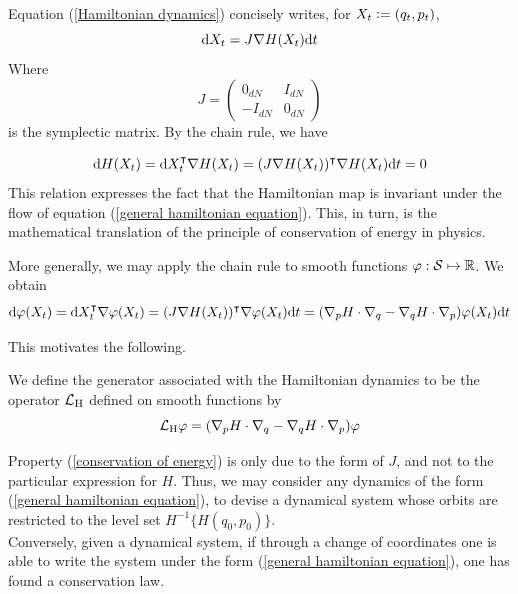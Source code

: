         \begin{remark}
        Equation (\ref{Hamiltonian dynamics}) concisely writes, for $X_t\mathrel{\mathop:}= (q_t,p_t)$, 
        \begin{equation}\label{general hamiltonian equation} \text d X_t=J\nabla H(X_t)\text dt\end{equation}
        Where
        $$J=\begin{pmatrix}
            0_{dN} & I_{dN}\\
            -I_{dN} & 0_{dN}
        \end{pmatrix}$$
        is the symplectic matrix. By the chain rule, we have

        \begin{equation}
        \label{conservation of energy} \text d H(X_t)=\text d X_t^{\intercal}\nabla H(X_t)=(J\nabla H(X_t))^\intercal \nabla H(X_t)\text dt=0
        \end{equation}
        This relation expresses the fact that the Hamiltonian map is invariant under the flow of equation (\ref{general hamiltonian equation}). This, in turn, is the mathematical translation of the principle of conservation of energy in physics.
        \end{remark}
    
        More generally, we may apply the chain rule to smooth functions $\varphi: \mathcal{S} \mapsto \mathbb{R}$.
        We obtain 
        $$ \text d \varphi(X_t)= \text d X_t^{\intercal} \nabla \varphi(X_t)=(J \nabla H(X_t))^\intercal \nabla \varphi(X_t)\text dt=(\nabla_p H \cdot \nabla_q - \nabla_q H \cdot \nabla_p)\varphi(X_t)\text dt$$

        This motivates the following.
        \begin{definition}
            We define the generator associated with the Hamiltonian dynamics to be the operator $\mathcal{L}_{\text{H}}$ defined on smooth functions by
        \begin{equation}
            \label{Hamiltonian generator}
            \mathcal{L}_{\text{H}}\varphi=(\nabla_p H \cdot \nabla_q - \nabla_q H \cdot \nabla_p)\varphi
        \end{equation}
    \end{definition}

    \begin{remark}
        \label{non-separable hamiltonian}
        Property (\ref{conservation of energy}) is only due to the form of $J$, and not to the particular expression for $H$.
        Thus, we may consider any dynamics of the form (\ref{general hamiltonian equation}), to devise a dynamical system whose orbits are restricted to the level set $H^{-1}\{H(q_0,p_0)\}$.\\
        Conversely, given a dynamical system, if through a change of coordinates one is able to write the system under the form (\ref{general hamiltonian equation}), one has found a conservation law.
    \end{remark}

